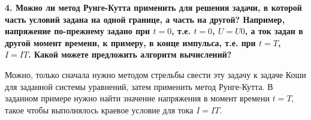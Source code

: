 \bigskip\bigskip\bigskip

\hspace{0cm} \textbf{4. Можно ли метод Рунге-Кутта применить для решения задачи, в которой часть условий задана на одной границе, а часть на другой? Например, напряжение по-прежнему задано при $t = 0$, т.е. $t = 0$, $U = U0$, а ток задан в другой момент времени, к примеру, в конце импульса, т.е. при $t = T $, $I = IT $. Какой можете предложить алгоритм вычислений?}

Можно, только сначала нужно методом стрельбы свести эту задачу к задаче Коши для заданной системы уравнений, затем применить метод Рунге-Кутта. В заданном примере нужно найти значение напряжения в момент времени $t = T$, такое чтобы выполнялось краевое условие для тока $I = IT$.

